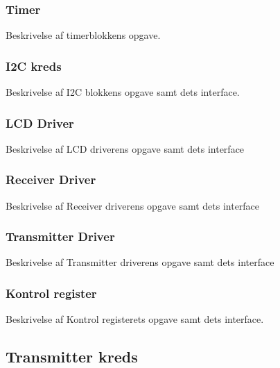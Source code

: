 \subsubsection{Timer}
Beskrivelse af timerblokkens opgave.
\subsubsection{I2C kreds}
Beskrivelse af I2C blokkens opgave samt dets interface.
\subsubsection{LCD Driver}
Beskrivelse af LCD driverens opgave samt dets interface
\subsubsection{Receiver Driver}
Beskrivelse af Receiver driverens opgave samt dets interface
\subsubsection{Transmitter Driver}
Beskrivelse af Transmitter driverens opgave samt dets interface
\subsubsection{Kontrol register}
Beskrivelse af Kontrol registerets opgave samt dets interface.
\subsection{Transmitter kreds}
